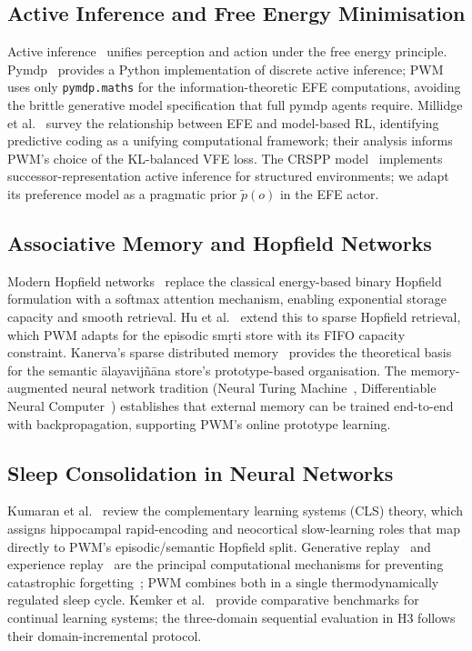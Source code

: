\documentclass[journal,onecolumn,11pt]{IEEEtran}
\begin{document}
\subsection{Active Inference and Free Energy Minimisation}

Active inference~\cite{friston2010free,friston2017active,friston2019active}
unifies perception and action under the free energy principle.
Pymdp~\cite{heins2022pymdp} provides a Python implementation of discrete
active inference; PWM uses only \texttt{pymdp.maths} for the information-theoretic
EFE computations, avoiding the brittle generative model specification that full
pymdp agents require.
Millidge et al.~\cite{millidge2021whence} survey the relationship between EFE and
model-based RL, identifying predictive coding as a unifying computational
framework; their analysis informs PWM's choice of the KL-balanced VFE loss.
The CRSPP model~\cite{sajid2021active} implements successor-representation active
inference for structured environments; we adapt its preference model as a
pragmatic prior $\tilde{p}(o)$ in the EFE actor.

\subsection{Associative Memory and Hopfield Networks}

Modern Hopfield networks~\cite{ramsauer2020hopfield} replace the classical
energy-based binary Hopfield formulation with a softmax attention mechanism,
enabling exponential storage capacity and smooth retrieval.
Hu et al.~\cite{hu2023sparse} extend this to sparse Hopfield retrieval,
which PWM adapts for the episodic smṛti store with its FIFO capacity constraint.
Kanerva's sparse distributed memory~\cite{kanerva1988sparse} provides the
theoretical basis for the semantic ālayavijñāna store's prototype-based
organisation.
The memory-augmented neural network tradition (Neural Turing
Machine~\cite{graves2014neural}, Differentiable Neural Computer~\cite{graves2016hybrid})
establishes that external memory can be trained end-to-end with backpropagation,
supporting PWM's online prototype learning.

\subsection{Sleep Consolidation in Neural Networks}

Kumaran et al.~\cite{kumaran2016learning} review the complementary learning
systems (CLS) theory, which assigns hippocampal rapid-encoding and neocortical
slow-learning roles that map directly to PWM's episodic/semantic Hopfield split.
Generative replay~\cite{shin2017continual} and experience replay~\cite{rolnick2019experience}
are the principal computational mechanisms for preventing catastrophic
forgetting~\cite{mccloskey1989catastrophic,kirkpatrick2017overcoming};
PWM combines both in a single thermodynamically regulated sleep cycle.
Kemker et al.~\cite{kemker2018measuring} provide comparative benchmarks for
continual learning systems; the three-domain sequential evaluation in H3 follows
their domain-incremental protocol.
\end{document}
